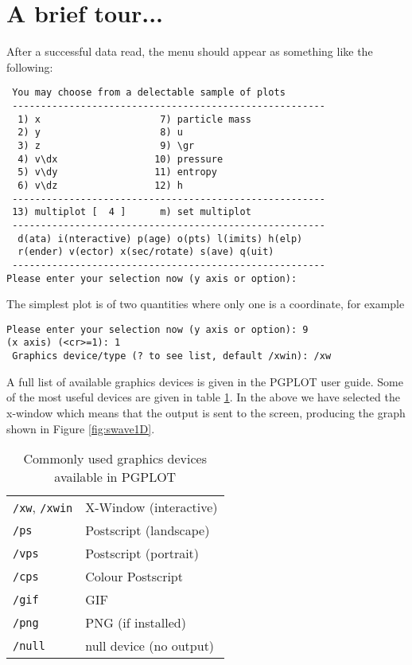 \documentclass[a4paper,12pt]{article}
\begin{document}
\section{A brief tour...}
After a successful data read, the menu should appear as something like the
following:
\begin{verbatim}
 You may choose from a delectable sample of plots
 -------------------------------------------------------
  1) x                     7) particle mass
  2) y                     8) u
  3) z                     9) \gr
  4) v\dx                 10) pressure
  5) v\dy                 11) entropy
  6) v\dz                 12) h
 -------------------------------------------------------
 13) multiplot [  4 ]      m) set multiplot
 -------------------------------------------------------
  d(ata) i(nteractive) p(age) o(pts) l(imits) h(elp)
  r(ender) v(ector) x(sec/rotate) s(ave) q(uit)
 -------------------------------------------------------
Please enter your selection now (y axis or option):
\end{verbatim}
The simplest plot is of two quantities where only one is a coordinate, for
example
\begin{verbatim}
Please enter your selection now (y axis or option): 9
(x axis) (<cr>=1): 1
 Graphics device/type (? to see list, default /xwin): /xw
\end{verbatim}
 A full list of available graphics devices is given in the PGPLOT user guide.
Some of the most useful devices are given in table \ref{tab:devices}. In the
above we have selected the x-window which means that the output is sent to the
screen, producing the graph shown in Figure \ref{fig:swave1D}.
\begin{table}[h]
\centering
\begin{tabular}{|l|l|}
\hline
\verb+/xw+, \verb+/xwin+ & X-Window (interactive) \\
\verb+/ps+ & Postscript (landscape) \\
\verb+/vps+ & Postscript (portrait) \\
\verb+/cps+ & Colour Postscript \\
\verb+/gif+ & GIF \\
\verb+/png+ & PNG (if installed) \\
\verb+/null+ & null device (no output) \\
\hline
\end{tabular}
\caption{Commonly used graphics devices available in PGPLOT}
\label{tab:devices}
\end{table}
\end{document}
